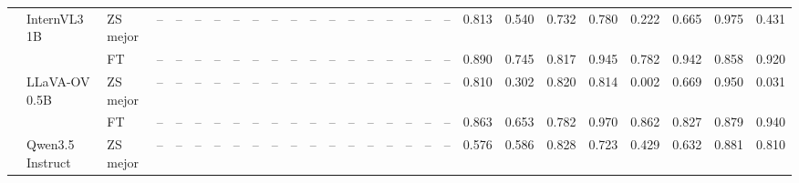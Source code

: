 \begin{tabular}{lllrrrrrrrrrrrrrrrrrrrrrrrr}
\cline{2-27}
 & \multirow[t]{2}{*}{InternVL3 1B} & ZS mejor & -- & -- & -- & -- & -- & -- & -- & -- & -- & -- & -- & -- & -- & -- & -- & -- & 0.813 & 0.540 & 0.732 & 0.780 & 0.222 & 0.665 & 0.975 & 0.431 \\
 &  & FT & -- & -- & -- & -- & -- & -- & -- & -- & -- & -- & -- & -- & -- & -- & -- & -- & 0.890 & 0.745 & 0.817 & 0.945 & 0.782 & 0.942 & 0.858 & 0.920 \\
\cline{2-27}
 & \multirow[t]{2}{*}{LLaVA-OV 0.5B} & ZS mejor & -- & -- & -- & -- & -- & -- & -- & -- & -- & -- & -- & -- & -- & -- & -- & -- & 0.810 & 0.302 & 0.820 & 0.814 & 0.002 & 0.669 & 0.950 & 0.031 \\
 &  & FT & -- & -- & -- & -- & -- & -- & -- & -- & -- & -- & -- & -- & -- & -- & -- & -- & 0.863 & 0.653 & 0.782 & 0.970 & 0.862 & 0.827 & 0.879 & 0.940 \\
\cline{2-27}
 & Qwen3.5 Instruct & ZS mejor & -- & -- & -- & -- & -- & -- & -- & -- & -- & -- & -- & -- & -- & -- & -- & -- & 0.576 & 0.586 & 0.828 & 0.723 & 0.429 & 0.632 & 0.881 & 0.810 \\
\cline{1-27} \cline{2-27}
\bottomrule
\end{tabular}
